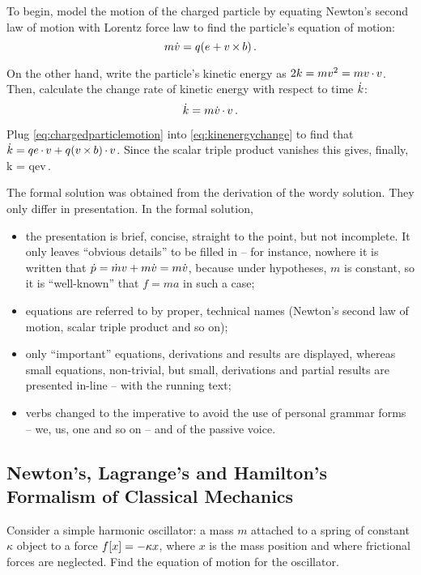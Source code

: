 To begin, model the motion of the charged particle by equating Newton's second law of motion with Lorentz force law to find the particle's equation of motion:
\begin{equation}\label{eq:chargedparticlemotion}
m\dot{v} = q(e + v\operatorname{\times} b)\,.
\end{equation}

On the other hand, write the particle's kinetic energy as $2k = mv^2 = mv\operatorname{\cdot} v$. Then, calculate the change rate of kinetic energy with respect to time $\dot{k}$:
\begin{equation}\label{eq:kinenergychange}
\dot{k} = m\dot{v}\operatorname{\cdot} v\,.
\end{equation}

Plug \cref{eq:chargedparticlemotion} into \cref{eq:kinenergychange} to find that $\dot{k} = qe\operatorname{\cdot} v + q(v\operatorname{\times} b)\operatorname{\cdot} v$. Since the scalar triple product vanishes this gives, finally,
\beq
\dt k = qe\iprod v\,.\mqed
\eeq

The formal solution was obtained from the derivation of the wordy solution. They only differ in presentation. In the formal solution,
\begin{itemize}
\item the presentation is brief, concise, straight to the point, but not incomplete. It only leaves ``obvious details'' to be filled in -- for instance, nowhere it is written that $\dot{p} = \dot{m}v + m\dot{v} = m\dot{v}$, because under hypotheses, $m$ is constant, so it is ``well-known'' that $f = ma$ in such a case;
\item equations are referred to by proper, technical names (Newton's second law of motion, scalar triple product and so on);
\item only ``important'' equations, derivations and results are displayed, whereas small equations, non-trivial, but small, derivations and partial results are presented in-line -- with the running text;
\item verbs changed to the imperative to avoid the use of personal grammar forms -- we, us, one and so on -- and of the passive voice.
\end{itemize}


\subsection{Newton's, Lagrange's and Hamilton's Formalism of Classical Mechanics}
Consider a simple harmonic oscillator: a mass $m$ attached to a spring of constant $\kappa$ object to a force $f\!\left[{x}\right] = -\kappa x$, where $x$ is the mass position and where frictional forces are neglected. Find the equation of motion for the oscillator.


